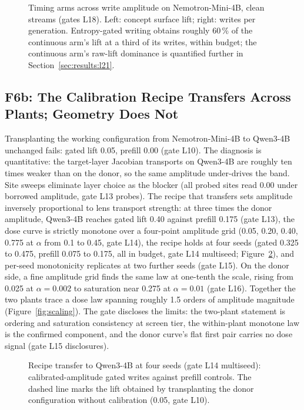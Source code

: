 \begin{figure}[t]
\centering
\resizebox{\columnwidth}{!}{}
\caption{Timing arms across write amplitude on Nemotron-Mini-4B, clean streams (gates L18). Left: concept surface lift; right: writes per generation. Entropy-gated writing obtains roughly 60\,\% of the continuous arm's lift at a third of its writes, within budget; the continuous arm's raw-lift dominance is quantified further in Section~\ref{sec:results:l21}.}
\label{fig:timing}
\end{figure}

\subsection{F6b: The Calibration Recipe Transfers Across Plants; Geometry Does Not}
\label{sec:results:transfer}

Transplanting the working configuration from Nemotron-Mini-4B to Qwen3-4B unchanged fails: gated lift 0.05, prefill 0.00 (gate L10). The diagnosis is quantitative: the target-layer Jacobian transports on Qwen3-4B are roughly ten times weaker than on the donor, so the same amplitude under-drives the band. Site sweeps eliminate layer choice as the blocker (all probed sites read 0.00 under borrowed amplitude, gate L13 probes). The recipe that transfers sets amplitude inversely proportional to lens transport strength: at three times the donor amplitude, Qwen3-4B reaches gated lift 0.40 against prefill 0.175 (gate L13), the dose curve is strictly monotone over a four-point amplitude grid (0.05, 0.20, 0.40, 0.775 at $\alpha$ from 0.1 to 0.45, gate L14), the recipe holds at four seeds (gated 0.325 to 0.475, prefill 0.075 to 0.175, all in budget, gate L14 multiseed; Figure~\ref{fig:recipe}), and per-seed monotonicity replicates at two further seeds (gate L15). On the donor side, a fine amplitude grid finds the same law at one-tenth the scale, rising from 0.025 at $\alpha=0.002$ to saturation near 0.275 at $\alpha=0.01$ (gate L16). Together the two plants trace a dose law spanning roughly 1.5 orders of amplitude magnitude (Figure~\ref{fig:scaling}). The gate discloses the limits: the two-plant statement is ordering and saturation consistency at screen tier, the within-plant monotone law is the confirmed component, and the donor curve's flat first pair carries no dose signal (gate L15 disclosures).

\begin{figure}[t]
\centering
\resizebox{\columnwidth}{!}{}
\caption{Recipe transfer to Qwen3-4B at four seeds (gate L14 multiseed): calibrated-amplitude gated writes against prefill controls. The dashed line marks the lift obtained by transplanting the donor configuration without calibration (0.05, gate L10).}
\label{fig:recipe}
\end{figure}

